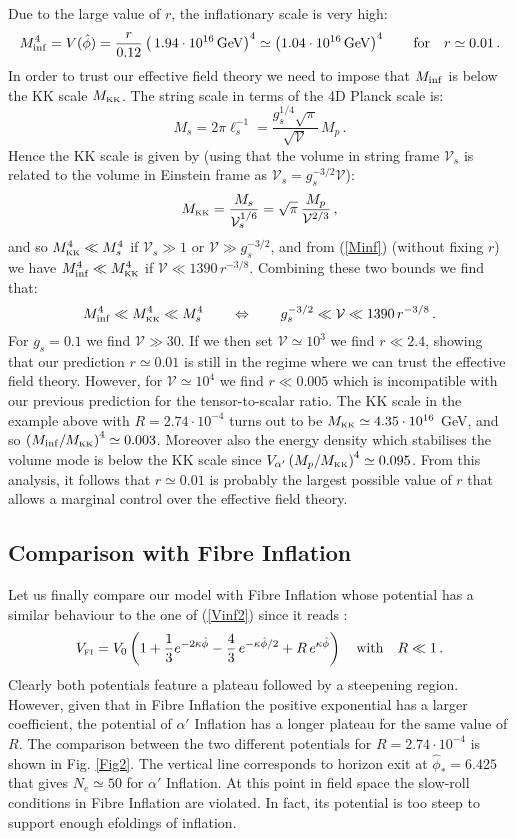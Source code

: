 \documentclass[11pt,a4paper]{article}
\newcommand{\be}{\begin{equation}}
\newcommand{\ee}{\end{equation}}
\def\KK{{\scriptscriptstyle \rm KK}}
\newcommand\vo{{\mathcal{V}}}
\begin{document}
Due to the large value of $r$, the inflationary scale is very high: 
\be
M_{\rm inf}^4 = V(\hat\phi) = \frac{r}{0.12} \left(\,1.94\cdot 10^{16}\,{\rm GeV}\right)^4 \simeq \left(1.04\cdot 10^{16}\,{\rm GeV}\right)^4\qquad\text{for}\quad r\simeq 0.01\,.
\label{Minf}
\ee
In order to trust our effective field theory we need to impose that $M_{\rm inf}$ is below the KK scale $M_\KK$. The string scale in terms of the 4D Planck scale is:
\be
M_s = 2\pi \ell_s^{-1} = \frac{g_s^{1/4}\sqrt{\pi}}{\sqrt{\vo}}\,M_p\,.
\ee
Hence the KK scale is given by (using that the volume in string frame $\vo_s$ is related to the volume in Einstein frame as $\vo_s = g_s^{-3/2} \vo$):
\be
M_\KK = \frac{M_s}{\vo_s^{1/6}} = \sqrt{\pi}\,\frac{M_p}{\vo^{2/3}}\,,
\ee
and so $M_\KK^4\ll M_s^4$ if $\vo_s\gg 1$ or $\vo\gg g_s^{-3/2}$, and from (\ref{Minf}) (without fixing $r$) we have $M_{\rm inf}^4\ll M_\KK^4$ if $\vo\ll 1390\,r^{-3/8}$. Combining these two bounds we find that:
\be
M_{\rm inf}^4\ll M_\KK^4 \ll M_s^4\qquad\Leftrightarrow\qquad g_s^{-3/2}\ll \vo\ll 1390\,r^{-3/8}\,.
\ee
For $g_s=0.1$ we find $\vo\gg 30$. If we then set $\vo\simeq 10^3$ we find $r\ll 2.4$, showing that our prediction $r\simeq 0.01$ is still in the regime where we can trust the effective field theory. However, for $\vo\simeq 10^4$ we find $r\ll 0.005$ which is incompatible with our previous prediction for the tensor-to-scalar ratio. The KK scale in the example above with $R=2.74\cdot 10^{-4}$ turns out to be $M_\KK\simeq 4.35\cdot 10^{16}$ GeV, and so $\left(M_{\rm inf}/M_\KK\right)^4\simeq 0.003$. Moreover also the energy density which stabilises the volume mode is below the KK scale since $V_{\alpha'}\left( M_p/M_\KK\right)^4\simeq 0.095$. From this analysis, it follows that $r\simeq 0.01$ is probably the largest possible value of $r$ that allows a marginal control over the effective field theory. 



\subsection{Comparison with Fibre Inflation}

Let us finally compare our model with Fibre Inflation whose potential has a similar behaviour to the one of (\ref{Vinf2}) since it reads \cite{Cicoli:2008gp}:
\be
V_{\scriptscriptstyle \rm FI} = V_0 \left(1 +\frac13 e^{-2\kappa\hat\phi}- \frac43 \,e^{-\kappa\hat\phi/2} +R\,e^{\kappa\hat\phi}\right)
\quad\text{with}\quad R\ll 1\,.
\label{VinfFI}
\ee
Clearly both potentials feature a plateau followed by a steepening region. However, given that in Fibre Inflation the positive exponential has a larger coefficient, the potential of $\alpha'$ Inflation has a longer plateau for the same value of $R$. The comparison between the two different potentials for $R=2.74\cdot 10^{-4}$ is shown in Fig. \ref{Fig2}. The vertical line corresponds to horizon exit at $\hat\phi_*=6.425$ that gives $N_e\simeq 50$ for $\alpha'$ Inflation. At this point in field space the slow-roll conditions in Fibre Inflation are violated. In fact, its potential is too steep to support enough efoldings of inflation. 
\end{document}
